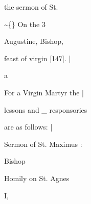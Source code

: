 \documentclass{breviary}
\begin{document}
\begin{brevbody}
\begin{rubricpar}
the sermon of St.

\end{rubricpar}
\textasciitilde\{\} On the 3

\begin{rubricpar}
Augustine, Bishop,

\end{rubricpar}
feast of virgin [147]. |

a

\begin{rubricpar}
For a Virgin Martyr the |

lessons and \_ responsories

are as follows: |

\end{rubricpar}
Sermon of St. Maximus :

Bishop

\begin{rubricpar}
Homily on St. Agnes

\end{rubricpar}
I,

\end{brevbody}
\end{document}
